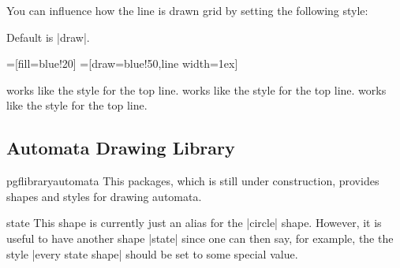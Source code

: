 \begin{itemize}
\begin{itemize}
\begin{codeexample}[]
\end{codeexample}
  \end{itemize}
  You can influence how the line is drawn grid by setting
  the following style:
  \begin{itemize}
    Default is |draw|.
\begin{codeexample}[]
=[fill=blue!20]    
=[draw=blue!50,line width=1ex]
\end{codeexample}
  \end{itemize}
  works like the style for the top line.
  works like the style for the top line.
  works like the style for the top line.
\end{itemize}


\subsection{Automata Drawing Library}

\begin{package}{pgflibraryautomata}
  This packages, which is still under construction, provides shapes
  and styles for drawing automata.
\end{package}


\begin{shape}{state}
  This shape is currently just an alias for the |circle|
  shape. However, it is useful to have another shape |state| since one
  can then say, for example, the the style |every state shape| should
  be set to some special value.
\end{shape}

